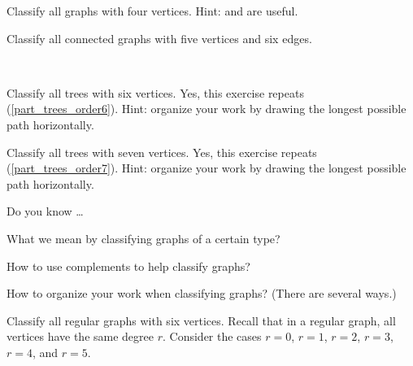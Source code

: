 \begin{exer}[\exerU] %
\label{exer_classify_order4}
    Classify all graphs with four vertices. Hint:  and
     are useful.
\end{exer}

\begin{exer}[\exerU] %
\label{exer_classify_order5}
    Classify all connected graphs with five vertices and six edges.
\end{exer}

\begin{exer}[\exerU] %
\label{exer_classify_trees_order6_order7}
~
    \begin{exerpart}
        \item Classify all trees with six vertices.  Yes, this exercise repeats  (\ref{part_trees_order6}). Hint: organize your work by drawing the longest possible path horizontally.
        \item Classify all trees with seven vertices.  Yes, this exercise repeats  (\ref{part_trees_order7}). Hint: organize your work by drawing the longest possible path horizontally.
    \end{exerpart}
\end{exer}

\begin{exer}[\exerR] %
\label{exer_dyk_classify_graphs}
    Do you know \ldots
        \begin{exerpart}
            \item What we mean by classifying graphs of a certain type?
            \item How to use complements to help classify graphs?
            \item How to organize your work when classifying graphs? (There are several ways.) 
        \end{exerpart}
\end{exer}

\begin{exer}[\exerE] %
\label{exer_classify_regular}
    Classify all regular graphs with six vertices.  Recall that in a regular graph, all vertices have the same degree $r$.  Consider the cases $r=0$, $r=1$, $r=2$, $r=3$, $r=4$, and $r=5$.
\end{exer}

